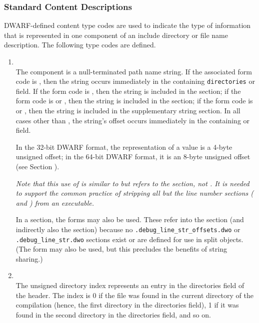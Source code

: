 \subsubsection{Standard Content Descriptions}
\label{chap:standardcontentdescriptions}
DWARF-defined content type codes are used to indicate
the type of information that is represented in one
component of an include directory or file name description.
The following type codes are defined.
\begin{enumerate}[1. ]

\item  \DWLNCTpathTARG \\
The component is a null-terminated path name string.
If the associated form code is \DWFORMstring{}, then the
string occurs immediately in the containing \texttt{directories}
or  field. 
\bb
If the form code is \DWFORMlinestrp, then the string is included in
the \dotdebuglinestr{} section; if the form code is \DWFORMstrp{} or
\DWFORMstrpeight, then the string is included in the \dotdebugstr{} section;
if the form code is \DWFORMstrpsup{} or \DWFORMstrpsupeight, then the
string is included in the supplementary string section. In all cases
other than \DWFORMstring, the string's offset
\eb
occurs immediately in the containing
 or  field.


In the 32-bit DWARF format, the representation of a
\DWFORMlinestrp{} value is a 4-byte unsigned offset; in the
64-bit DWARF format, it is an 8-byte unsigned offset (see
Section ).

\textit{Note that this use of \DWFORMlinestrp{} is similar to
\DWFORMstrp{} but refers to the \dotdebuglinestr{} section,
not \dotdebugstr. 
It is needed to support the common practice of stripping all but 
the line number sections (\dotdebugline{} and \dotdebuglinestr{}) 
from an executable.
}

In a \dotdebuglinedwo{} section, the forms \DWFORMstrxXNand{} may
also be used. These refer into the \dotdebugstroffsetsdwo{}
section (and indirectly also the \dotdebugstrdwo{} section)
because no \texttt{.debug\_line\_str\_offsets.dwo} or 
\texttt{.debug\_line\_str.dwo} sections exist or are defined for 
use in split objects. (The form \DWFORMstring{} may also be used, 
but this precludes the benefits of string sharing.)
   
\item \DWLNCTdirectoryindexTARG \\
The unsigned directory index represents an entry in the
directories field of the header. The index is 0 if
the file was found in the current directory of the compilation
(hence, the first directory in the directories field),
1 if it was found in the second directory in the directories
field, and so on.


\end{enumerate}
